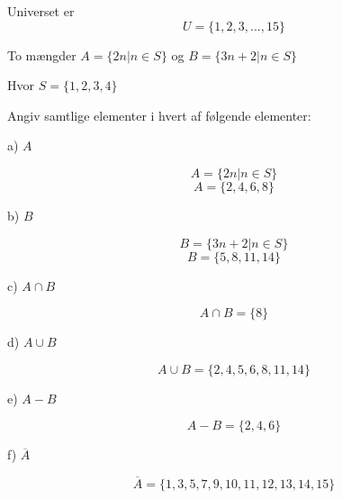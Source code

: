 \documentclass{article}
\begin{document}
Universet er
\[U=\{1,2,3,...,15\}\]

To mængder \(A=\{2n | n \in S\}\) og \(B=\{3n+2 | n \in S\}\)


Hvor \(S=\{1,2,3,4\}\)

Angiv samtlige elementer i hvert af følgende elementer:

a) \(A\) \par

\[A=\{2n | n \in S\}\]
\[A=\{2,4,6,8\}\]
\par
b) \(B\) \par
\[B=\{3n+2 | n \in S\}\]
\[B=\{5,8,11,14\}\]
\par
c) \(A \cap B\) \par
\[A \cap B=\{8\}\]
\par
d) \(A \cup B\) \par
\[A \cup B=\{2,4,5,6,8,11,14\}\]
\par
e) \(A - B\) \par
\[A - B=\{2,4,6\}\]
\par
f) \(\overline A\) \par
\[\overline A=\{1,3,5,7,9,10,11,12,13,14,15\}\]
\par
\end{document}

